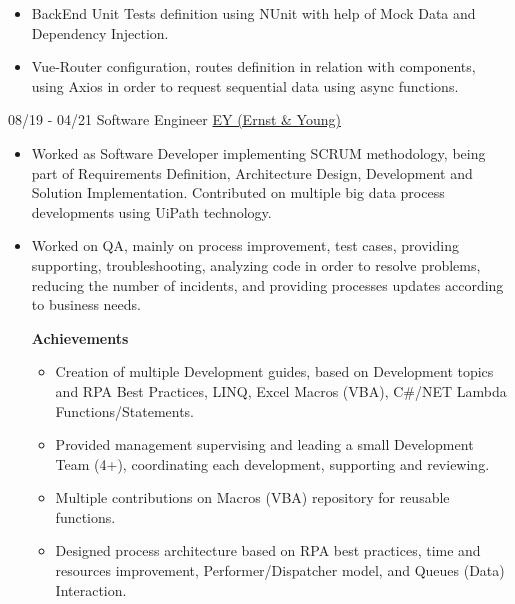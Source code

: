 \documentclass[letterpaper]{twentysecondcv} %
\begin{document}
\begin{twenty}
{\begin{itemize}
\begin{itemize}
                    \item BackEnd Unit Tests definition using NUnit with help of Mock Data and Dependency Injection.
                    
                    \item Vue-Router configuration, routes definition in relation with components, using Axios in order to request sequential data using async functions. %

                \end{itemize}
            \end{itemize}
        }

	    \twentyitem
    	{08/19 - 04/21}
        {Software Engineer}
        { \href{https://www.ey.com/es_cr}{EY (Ernst \& Young)} }
        {
            \begin{itemize}
                \item Worked as Software Developer implementing SCRUM methodology, being part of Requirements Definition, Architecture Design, Development and Solution Implementation. Contributed on multiple big data process developments using UiPath technology.
                
                \item Worked on QA, mainly on process improvement, test cases, providing supporting, troubleshooting, analyzing code in order to resolve problems, reducing the number of incidents, and providing processes updates according to business needs.
            
                \textbf{Achievements}
                \begin{itemize}
        
                    \item Creation of multiple Development guides, based on Development topics and RPA Best Practices, LINQ, Excel Macros (VBA), C\#/NET Lambda Functions/Statements.
                    
                    \item Provided management supervising and leading a small Development Team (4+), coordinating each development, supporting and reviewing.
                    
                    \item Multiple contributions on Macros (VBA) repository for reusable functions.
                    
                    \item Designed process architecture based on RPA best practices, time and resources improvement, Performer/Dispatcher model, and Queues (Data) Interaction.
                    

\end{itemize}
\end{itemize}}
\end{twenty}
\end{document}
